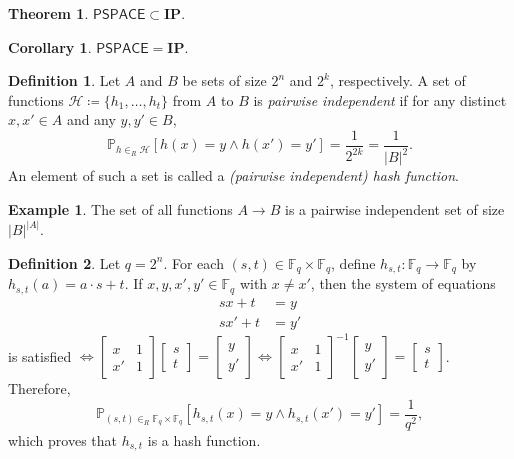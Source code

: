 \documentclass[10pt,letterpaper,cm]{nupset}
\theoremstyle{definition}
\newtheorem*{definition}{Definition}
\newtheorem{exmp}{Example}
\newtheorem{theorem}{Theorem}
\newtheorem{corollary}{Corollary}
\newcommand{\F}{\mathbb F}
\renewcommand{\H}{\mathcal H}
\newcommand{\1}{\mathbf{1}}
\newcommand{\0}{\vec 0}
\begin{document}
\begin{theorem}
$\mathsf{PSPACE} \subset \mathbf{IP}$.
\end{theorem}

\begin{corollary}
$\mathsf{PSPACE} = \mathbf{IP}$.
\end{corollary}

\begin{definition}
Let $A$ and $B$ be sets of size $2^n$ and $2^k$, respectively. A set of functions $\H\coloneqq \{h_1, \ldots, h_t\}$ from $A$ to $B$ is \textit{pairwise independent} if for any distinct $x, x' \in A$ and any $y, y' \in B$, $$  \mathbb{P}_{h \in_R \H}[h(x) = y \land h(x') = y'] = \frac{1}{2^{2k}}  = \frac{1}{|B|^2}.$$ An element of such a set is called a \textit{(pairwise independent) hash function}.
\end{definition}

\begin{exmp}
The set of all functions $A \to B$ is a pairwise independent set of size $|B|^{|A|}$. 
\end{exmp}

\begin{definition}
Let $q= 2^n$. For each $(s,t) \in \F_q \times \F_q$, define $h_{s,t} : \F_q \to \F_q$ by $h_{s,t}(a) = a \cdot s +t$. If $x,y, x', y' \in \F_q$ with $x \ne x'$, then the system of equations \begin{align*} 
sx + t & = y \\ sx' +t & = y'
\end{align*} 
is satisfied $\iff  \begin{bmatrix}  x & 1 \\ x' & 1   \end{bmatrix} \begin{bmatrix} s \\ t    \end{bmatrix} = \begin{bmatrix} y \\ y' \end{bmatrix} \iff  \begin{bmatrix}  x & 1 \\ x' & 1   \end{bmatrix}^{-1} \begin{bmatrix} y \\ y' \end{bmatrix}  = \begin{bmatrix} s \\ t    \end{bmatrix} $. Therefore, $$\mathbb{P}_{(s,t)\in_R \F_q\times \F_q}[h_{s,t}(x) = y \land h_{s,t}(x') = y'] = \frac{1}{q^2},$$ which proves that $h_{s,t}$ is a hash function.
\end{definition}
\end{document}
